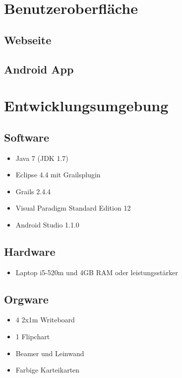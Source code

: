 \documentclass[10pt,a4paper]{article}
\begin{document}




\section{Benutzeroberfl\"ache}
\subsection{Webseite}
\subsection{Android App}


\section{Entwicklungsumgebung}
\subsection{Software}
\begin{itemize}
	\item Java 7 (JDK 1.7)
	\item Eclipse 4.4 mit Grailsplugin
	\item Grails 2.4.4
	\item Visual Paradigm Standard Edition 12
	\item Android Studio 1.1.0
\end{itemize}
\subsection{Hardware}
\begin{itemize}
	\item Laptop i5-520m und 4GB RAM oder leistungsst\"arker
\end{itemize}
\subsection{Orgware}
\begin{itemize}
	\item 4 2x1m Writeboard
	\item 1 Flipchart
	\item Beamer und Leinwand
	\item Farbige Karteikarten
\end{itemize}
\end{document}
